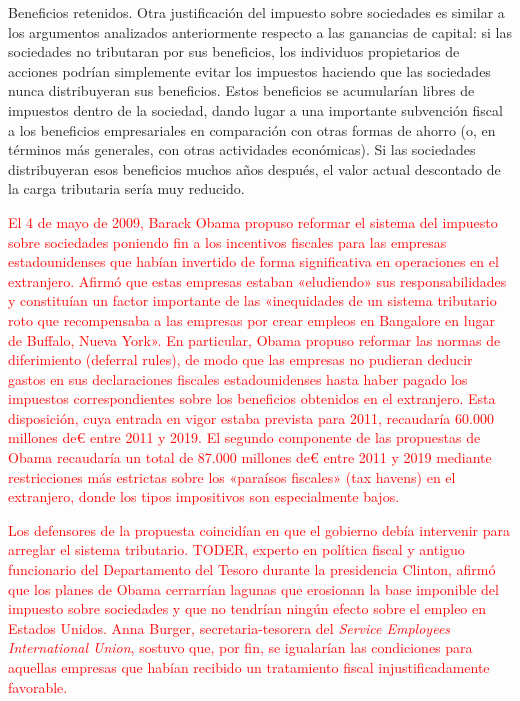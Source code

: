 \documentclass[10pt,a4paper]{article}
\begin{document}
Beneficios retenidos. Otra justificación del impuesto sobre sociedades es similar a los argumentos analizados anteriormente respecto a las ganancias de capital: si las sociedades no tributaran por sus beneficios, los individuos propietarios de acciones podrían simplemente evitar los impuestos haciendo que las sociedades nunca distribuyeran sus beneficios. Estos beneficios se acumularían libres de impuestos dentro de la sociedad, dando lugar a una importante subvención fiscal a los beneficios empresariales en comparación con otras formas de ahorro (o, en términos más generales, con otras actividades económicas). Si las sociedades distribuyeran esos beneficios muchos años después, el valor actual descontado de la carga tributaria sería muy reducido.

\textcolor{red}{El 4 de mayo de 2009, Barack Obama propuso reformar el sistema del impuesto sobre sociedades poniendo fin a los incentivos fiscales para las empresas estadounidenses que habían invertido de forma significativa en operaciones en el extranjero. Afirmó que estas empresas estaban «eludiendo» sus responsabilidades y constituían un factor importante de las «inequidades de un sistema tributario roto que recompensaba a las empresas por crear empleos en Bangalore en lugar de Buffalo, Nueva York». En particular, Obama propuso reformar las normas de diferimiento (deferral rules), de modo que las empresas no pudieran deducir gastos en sus declaraciones fiscales estadounidenses hasta haber pagado los impuestos correspondientes sobre los beneficios obtenidos en el extranjero. Esta disposición, cuya entrada en vigor estaba prevista para 2011, recaudaría 60.000 millones de€ entre 2011 y 2019. El segundo componente de las propuestas de Obama recaudaría un total de 87.000 millones de€ entre 2011 y 2019 mediante restricciones más estrictas sobre los «paraísos fiscales» (tax havens) en el extranjero, donde los tipos impositivos son especialmente bajos.

Los defensores de la propuesta coincidían en que el gobierno debía intervenir para arreglar el sistema tributario. TODER, experto en política fiscal y antiguo funcionario del Departamento del Tesoro durante la presidencia Clinton, afirmó que los planes de Obama cerrarrían lagunas que erosionan la base imponible del impuesto sobre sociedades y que no tendrían ningún efecto sobre el empleo en Estados Unidos. Anna Burger, secretaria-tesorera del \textit{Service Employees International Union}, sostuvo que, por fin, se igualarían las condiciones para aquellas empresas que habían recibido un tratamiento fiscal injustificadamente favorable.

}
\end{document}
